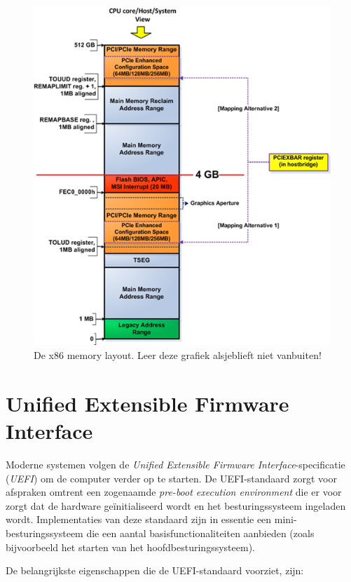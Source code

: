 \begin{figure}
\centering
\includegraphics[scale=.75]{images/iomappedmemory.png}
\caption{De x86 memory layout. Leer deze grafiek alsjeblieft niet vanbuiten!}
\label{memorymapped}
\end{figure}

\section{Unified Extensible Firmware Interface}

Moderne systemen volgen de \emph{Unified Extensible Firmware Interface}-specificatie
(\emph{UEFI}) om de computer verder op te starten. De UEFI-standaard zorgt voor afspraken omtrent een zogenaamde
\emph{pre-boot execution environment} die er voor zorgt dat de hardware ge\"initialiseerd
wordt en het besturingssysteem ingeladen wordt. Implementaties van deze standaard zijn in essentie een
mini-besturingssysteem die een aantal basisfunctionaliteiten aanbieden (zoals bijvoorbeeld
het starten van het hoofdbesturingssysteem).

De belangrijkste eigenschappen die de UEFI-standaard voorziet, zijn:

